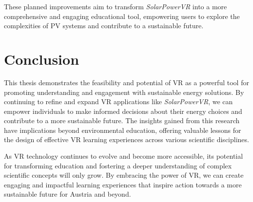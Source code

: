 \documentclass[draft, final]{vutinfth} %
\begin{document}
These planned improvements aim to transform \textit{SolarPowerVR} into a more comprehensive and engaging educational tool, empowering users to explore the complexities of PV systems and contribute to a sustainable future.

\section{Conclusion}

This thesis demonstrates the feasibility and potential of VR as a powerful tool for promoting understanding and engagement with sustainable energy solutions.  By continuing to refine and expand VR applications like \textit{SolarPowerVR}, we can empower individuals to make informed decisions about their energy choices and contribute to a more sustainable future.  The insights gained from this research have implications beyond environmental education, offering valuable lessons for the design of effective VR learning experiences across various scientific disciplines.

As VR technology continues to evolve and become more accessible, its potential for transforming education and fostering a deeper understanding of complex scientific concepts will only grow. By embracing the power of VR, we can create engaging and impactful learning experiences that inspire action towards a more sustainable future for Austria and beyond.
\backmatter

\listoffigures %



\printindex

\printglossaries


% 
% 

\end{document}
